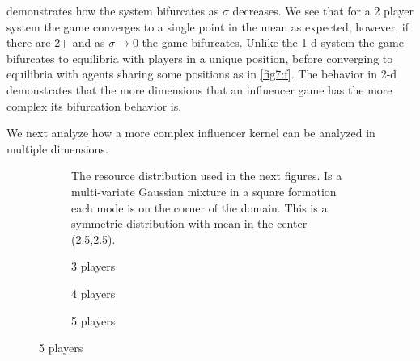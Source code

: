 \documentclass{article}
\begin{document}
                 demonstrates how the system bifurcates as $\sigma$ decreases. We see that for a 2 player system the game converges to a single point in the mean as expected; however, if there are 2+ and as $\sigma\to 0$  the game bifurcates. Unlike the 1-d system the game bifurcates to equilibria with players in a unique position, before converging to equilibria with agents sharing some positions as in \cref{fig7:f}. The behavior in 2-d demonstrates that the more dimensions that an influencer game has the more complex its bifurcation behavior is. 

                We next analyze how a more complex influencer kernel can be analyzed in multiple dimensions. 
            
        
                \begin{figure}[ht!] 
                    \centering
                    \begin{subfigure}[b]{0.6\linewidth}
                        \centering
                        
                        \caption{The resource distribution used in the next figures. Is a multi-variate Gaussian mixture in a square formation each mode is on the corner of the domain. This is a symmetric distribution with mean in the center (2.5,2.5). }
                        \label{fig7:a}
                    \end{subfigure}
                    
                    \begin{subfigure}[b]{0.3\linewidth}
                        \centering
                         
                        \caption{3 players} 
                        \label{fig7:b} 
                        \vspace{4ex}
                    \end{subfigure}%
                    \begin{subfigure}[b]{0.3\linewidth}
                        \centering
                         
                        \caption{4 players} 
                        \label{fig7:c} 
                        \vspace{4ex}
                    \end{subfigure} 
                    \begin{subfigure}[b]{0.3\linewidth}
                        \centering
                         
                        \caption{5 players} 
                        \label{fig7:d}
                        \vspace{4ex}
                    \end{subfigure}%
                    

\end{figure}
\end{document}
